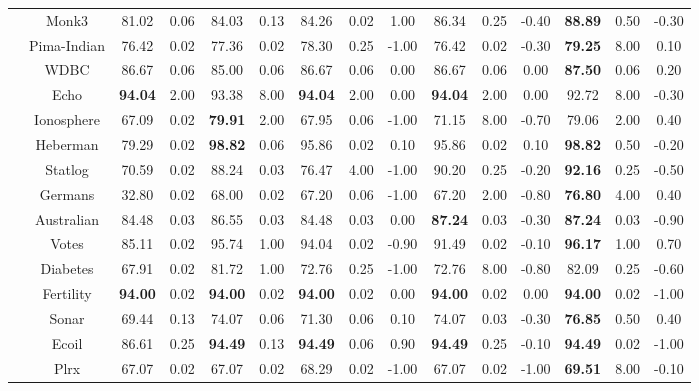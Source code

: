\documentclass[journal,12pn, onecolumn]{IEEEtran}
\begin{document}
{{{\begin{table}
{{\begin{tabular}{ccccccccccccccc}
          & Monk3 & 81.02  & 0.06  & 84.03  & 0.13  & 84.26  & 0.02  & 1.00  & 86.34  & 0.25  & -0.40  & \textbf{88.89 } & 0.50  & -0.30  \\
          & Pima-Indian & 76.42  & 0.02  & 77.36  & 0.02  & 78.30  & 0.25  & -1.00  & 76.42  & 0.02  & -0.30  & \textbf{79.25 } & 8.00  & 0.10  \\
          & WDBC  & 86.67  & 0.06  & 85.00  & 0.06  & 86.67  & 0.06  & 0.00  & 86.67  & 0.06  & 0.00  & \textbf{87.50 } & 0.06  & 0.20  \\
          & Echo  & \textbf{94.04 } & 2.00  & 93.38  & 8.00  & \textbf{94.04 } & 2.00  & 0.00  & \textbf{94.04 } & 2.00  & 0.00  & 92.72  & 8.00  & -0.30  \\
          & Ionosphere & 67.09  & 0.02  & \textbf{79.91 } & 2.00  & 67.95  & 0.06  & -1.00  & 71.15  & 8.00  & -0.70  & 79.06  & 2.00  & 0.40  \\
          & Heberman & 79.29  & 0.02  & \textbf{98.82 } & 0.06  & 95.86  & 0.02  & 0.10  & 95.86  & 0.02  & 0.10  & \textbf{98.82 } & 0.50  & -0.20  \\
          & Statlog & 70.59  & 0.02  & 88.24  & 0.03  & 76.47  & 4.00  & -1.00  & 90.20  & 0.25  & -0.20  & \textbf{92.16 } & 0.25  & -0.50  \\
          & Germans & 32.80  & 0.02  & 68.00  & 0.02  & 67.20  & 0.06  & -1.00  & 67.20  & 2.00  & -0.80  & \textbf{76.80 } & 4.00  & 0.40  \\
          & Australian & 84.48  & 0.03  & 86.55  & 0.03  & 84.48  & 0.03  & 0.00  & \textbf{87.24 } & 0.03  & -0.30  & \textbf{87.24 } & 0.03  & -0.90  \\
          & Votes & 85.11  & 0.02  & 95.74  & 1.00  & 94.04  & 0.02  & -0.90  & 91.49  & 0.02  & -0.10  & \textbf{96.17 } & 1.00  & 0.70  \\
          & Diabetes & 67.91  & 0.02  & 81.72  & 1.00  & 72.76  & 0.25  & -1.00  & 72.76  & 8.00  & -0.80  & 82.09  & 0.25  & -0.60  \\
          & Fertility & \textbf{94.00 } & 0.02  & \textbf{94.00 } & 0.02  & \textbf{94.00 } & 0.02  & 0.00  & \textbf{94.00 } & 0.02  & 0.00  & \textbf{94.00 } & 0.02  & -1.00  \\
          & Sonar & 69.44  & 0.13  & 74.07  & 0.06  & 71.30  & 0.06  & 0.10  & 74.07  & 0.03  & -0.30  & \textbf{76.85 } & 0.50  & 0.40  \\
          & Ecoil & 86.61  & 0.25  & \textbf{94.49 } & 0.13  & \textbf{94.49 } & 0.06  & 0.90  & \textbf{94.49 } & 0.25  & -0.10  & \textbf{94.49 } & 0.02  & -1.00  \\
          & Plrx  & 67.07  & 0.02  & 67.07  & 0.02  & 68.29  & 0.02  & -1.00  & 67.07  & 0.02  & -1.00  & \textbf{69.51 } & 8.00  & -0.10  \\
          

\end{tabular}}}
\end{table}}}}
\end{document}
